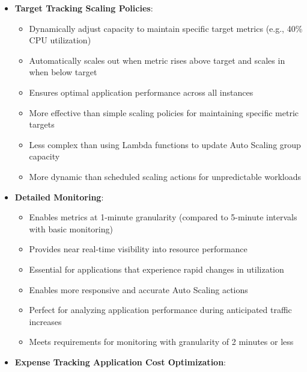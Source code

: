 \documentclass[11pt,a4paper]{report}
\begin{document}
\begin{itemize}
\begin{itemize}
  \item Suitable for workloads that can be interrupted without negative impact
  \item Perfect for jobs that take 60+ minutes to complete
  \item More appropriate than Reserved Instances for dynamic, interruptible workloads
  \item More cost-efficient than On-Demand Instances for stateless batch jobs
  \item Better than Lambda for jobs exceeding Lambda's 15-minute execution limit
\end{itemize}
  \item \textbf{Target Tracking Scaling Policies}:
\begin{itemize}
  \item Dynamically adjust capacity to maintain specific target metrics (e.g., 40\% CPU utilization)
  \item Automatically scales out when metric rises above target and scales in when below target
  \item Ensures optimal application performance across all instances
  \item More effective than simple scaling policies for maintaining specific metric targets
  \item Less complex than using Lambda functions to update Auto Scaling group capacity
  \item More dynamic than scheduled scaling actions for unpredictable workloads
\end{itemize}
  \item \textbf{Detailed Monitoring}:
\begin{itemize}
  \item Enables metrics at 1-minute granularity (compared to 5-minute intervals with basic monitoring)
  \item Provides near real-time visibility into resource performance
  \item Essential for applications that experience rapid changes in utilization
  \item Enables more responsive and accurate Auto Scaling actions
  \item Perfect for analyzing application performance during anticipated traffic increases
  \item Meets requirements for monitoring with granularity of 2 minutes or less
\end{itemize}
  \item \textbf{Expense Tracking Application Cost Optimization}:

\end{itemize}
\end{document}
